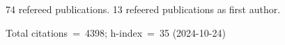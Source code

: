 74 refereed publications. 13 refeered publications as first author.

Total citations~=~4398; h-index~=~35 (2024-10-24)